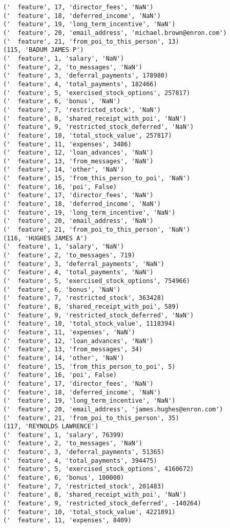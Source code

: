 \begin{verbatim}
('  feature', 17, 'director_fees', 'NaN')
('  feature', 18, 'deferred_income', 'NaN')
('  feature', 19, 'long_term_incentive', 'NaN')
('  feature', 20, 'email_address', 'michael.brown@enron.com')
('  feature', 21, 'from_poi_to_this_person', 13)
(115, 'BADUM JAMES P')
('  feature', 1, 'salary', 'NaN')
('  feature', 2, 'to_messages', 'NaN')
('  feature', 3, 'deferral_payments', 178980)
('  feature', 4, 'total_payments', 182466)
('  feature', 5, 'exercised_stock_options', 257817)
('  feature', 6, 'bonus', 'NaN')
('  feature', 7, 'restricted_stock', 'NaN')
('  feature', 8, 'shared_receipt_with_poi', 'NaN')
('  feature', 9, 'restricted_stock_deferred', 'NaN')
('  feature', 10, 'total_stock_value', 257817)
('  feature', 11, 'expenses', 3486)
('  feature', 12, 'loan_advances', 'NaN')
('  feature', 13, 'from_messages', 'NaN')
('  feature', 14, 'other', 'NaN')
('  feature', 15, 'from_this_person_to_poi', 'NaN')
('  feature', 16, 'poi', False)
('  feature', 17, 'director_fees', 'NaN')
('  feature', 18, 'deferred_income', 'NaN')
('  feature', 19, 'long_term_incentive', 'NaN')
('  feature', 20, 'email_address', 'NaN')
('  feature', 21, 'from_poi_to_this_person', 'NaN')
(116, 'HUGHES JAMES A')
('  feature', 1, 'salary', 'NaN')
('  feature', 2, 'to_messages', 719)
('  feature', 3, 'deferral_payments', 'NaN')
('  feature', 4, 'total_payments', 'NaN')
('  feature', 5, 'exercised_stock_options', 754966)
('  feature', 6, 'bonus', 'NaN')
('  feature', 7, 'restricted_stock', 363428)
('  feature', 8, 'shared_receipt_with_poi', 589)
('  feature', 9, 'restricted_stock_deferred', 'NaN')
('  feature', 10, 'total_stock_value', 1118394)
('  feature', 11, 'expenses', 'NaN')
('  feature', 12, 'loan_advances', 'NaN')
('  feature', 13, 'from_messages', 34)
('  feature', 14, 'other', 'NaN')
('  feature', 15, 'from_this_person_to_poi', 5)
('  feature', 16, 'poi', False)
('  feature', 17, 'director_fees', 'NaN')
('  feature', 18, 'deferred_income', 'NaN')
('  feature', 19, 'long_term_incentive', 'NaN')
('  feature', 20, 'email_address', 'james.hughes@enron.com')
('  feature', 21, 'from_poi_to_this_person', 35)
(117, 'REYNOLDS LAWRENCE')
('  feature', 1, 'salary', 76399)
('  feature', 2, 'to_messages', 'NaN')
('  feature', 3, 'deferral_payments', 51365)
('  feature', 4, 'total_payments', 394475)
('  feature', 5, 'exercised_stock_options', 4160672)
('  feature', 6, 'bonus', 100000)
('  feature', 7, 'restricted_stock', 201483)
('  feature', 8, 'shared_receipt_with_poi', 'NaN')
('  feature', 9, 'restricted_stock_deferred', -140264)
('  feature', 10, 'total_stock_value', 4221891)
('  feature', 11, 'expenses', 8409)

\end{verbatim}
